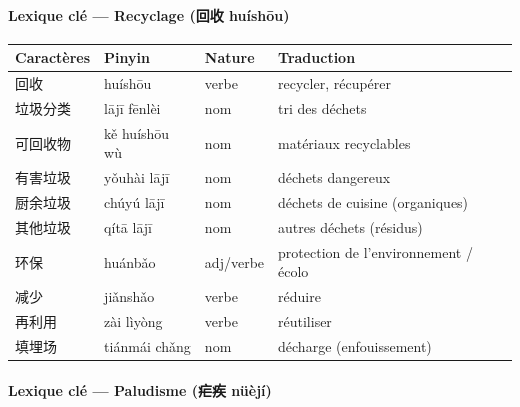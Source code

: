\documentclass[11pt]{article}
\begin{document}
\begin{bilan}

\paragraph{Lexique clé — Recyclage (回收 huíshōu)}

\begin{center}
\begin{tabularx}{\linewidth}{|X|X|X|X|}
\hline
\rowcolor{popblueL} \textbf{Caractères} & \textbf{Pinyin} & \textbf{Nature} & \textbf{Traduction} \\ \hline
回收 & huíshōu & verbe & recycler, récupérer \\ \hline
垃圾分类 & lājī fēnlèi & nom & tri des déchets \\ \hline
可回收物 & kě huíshōu wù & nom & matériaux recyclables \\ \hline
有害垃圾 & yǒuhài lājī & nom & déchets dangereux \\ \hline
厨余垃圾 & chúyú lājī & nom & déchets de cuisine (organiques) \\ \hline
其他垃圾 & qítā lājī & nom & autres déchets (résidus) \\ \hline
环保 & huánbǎo & adj/verbe & protection de l'environnement / écolo \\ \hline
减少 & jiǎnshǎo & verbe & réduire \\ \hline
再利用 & zài lìyòng & verbe & réutiliser \\ \hline
填埋场 & tiánmái chǎng & nom & décharge (enfouissement) \\ \hline
\end{tabularx}
\end{center}

\paragraph{Lexique clé — Paludisme (疟疾 nüèjí)}


\end{bilan}
\end{document}
